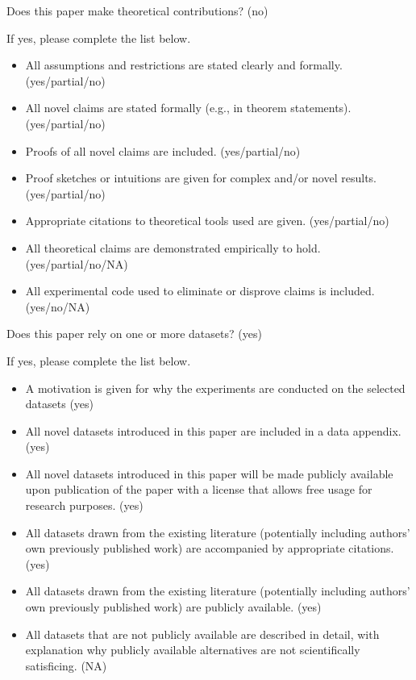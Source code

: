 \documentclass[letterpaper]{article} %
\begin{document}
Does this paper make theoretical contributions? (no) 

If yes, please complete the list below.

\begin{itemize}
\item All assumptions and restrictions are stated clearly and formally. (yes/partial/no)
\item All novel claims are stated formally (e.g., in theorem statements). (yes/partial/no)
\item Proofs of all novel claims are included. (yes/partial/no)
\item Proof sketches or intuitions are given for complex and/or novel results. (yes/partial/no)
\item Appropriate citations to theoretical tools used are given. (yes/partial/no)
\item All theoretical claims are demonstrated empirically to hold. (yes/partial/no/NA)
\item All experimental code used to eliminate or disprove claims is included. (yes/no/NA)
\end{itemize}

Does this paper rely on one or more datasets? (yes)

If yes, please complete the list below.

\begin{itemize}
\item A motivation is given for why the experiments are conducted on the selected datasets (yes)
\item All novel datasets introduced in this paper are included in a data appendix. (yes)
\item All novel datasets introduced in this paper will be made publicly available upon publication of the paper with a license that allows free usage for research purposes. (yes)
\item All datasets drawn from the existing literature (potentially including authors’ own previously published work) are accompanied by appropriate citations. (yes)
\item All datasets drawn from the existing literature (potentially including authors’ own previously published work) are publicly available. (yes)
\item All datasets that are not publicly available are described in detail, with explanation why publicly available alternatives are not scientifically satisficing. (NA)
\end{itemize}
\end{document}

